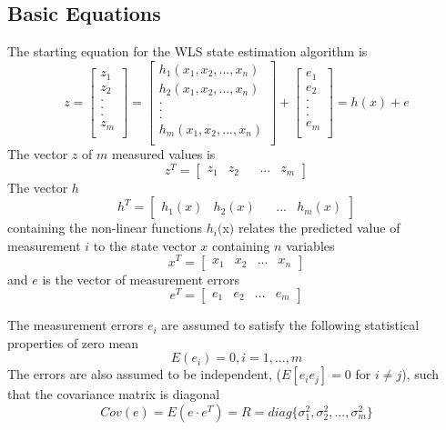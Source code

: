 \documentclass[12pt]{article}
\begin{document}
\subsection*{Basic Equations}
The starting equation for the WLS state estimation algorithm is
\begin{equation}\label{eq:main}
z=\begin{bmatrix} z_1\\ z_2\\ .\\ .\\ .\\ z_m\\ \end{bmatrix} =
\begin{bmatrix} h_1(x_1,x_2,...,x_n)\\ h_2(x_1,x_2,...,x_n)\\ .\\ .\\ .\\ h_m(x_1,x_2,...,x_n)\\ \end{bmatrix}+\begin{bmatrix} e_1\\ e_2\\ .\\ .\\ .\\ e_m\\ \end{bmatrix}
=h(x)+e
\end{equation} 
The vector $z$ of $m$ measured values is
\[
z^{T} = \begin{bmatrix} z_1 & z_2 && ... & z_{m}\end{bmatrix}
\]
The vector $h$
\[
h^{T} = \begin{bmatrix} h_1(x) & h_2(x) && ... & h_{m}(x) \end{bmatrix}
\]
containing the non-linear functions $h_{i}($x$)$ relates the predicted value of
measurement $i$ to the state vector $x$ containing $n$ variables
\[
x^{T} = \begin{bmatrix} x_{1} & x_{2} & ... & x_{n} \end{bmatrix}
\]
and $e$ is the vector of measurement errors
\[
e^{T} = \begin{bmatrix} e_{1} & e_{2} & ... & e_{m} \end{bmatrix}
\]

The measurement errors $e_i$ are assumed to satisfy the following statistical
properties of zero mean
\begin{equation}
E(e_i) = 0, i = 1,...,m
\end{equation} 
The errors are also assumed to be independent,
($E[e_i e_j]=0$ for $i\ne j$), such that the covariance matrix is diagonal
\begin{equation}
Cov(e)=E(e\cdot e^T) = R =diag \{{\sigma_1 ^2,\sigma_2^2,...,\sigma_m ^2}\}
\end{equation} 
\end{document}
